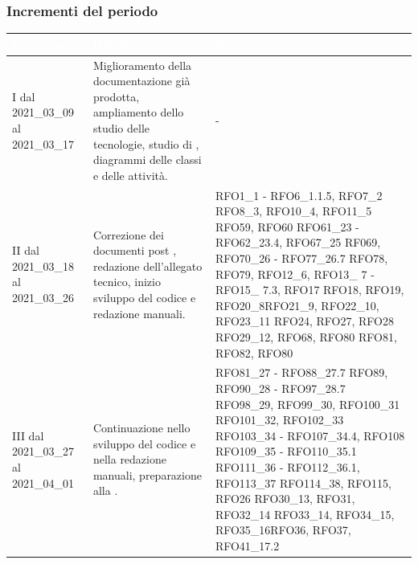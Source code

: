 \subsubsection{Incrementi del periodo}\label{IncrementiPDettaglio}
\begin{table}[H]
	\begin{center}
		\begin{tabular}{ |C{3cm} C{6cm} C{7cm}| }
			\textcolor{white}{\textbf{Incremento}} & \textcolor{white}{\textbf{Obiettivi}} & \textcolor{white}{\textbf{Requisiti}} \\ \hline
			I dal 2021\_03\_09 al 2021\_03\_17& Miglioramento della documentazione già prodotta, ampliamento dello studio delle tecnologie, studio di , diagrammi delle classi e delle attività.  & - \\ \hline
			II dal 2021\_03\_18 al 2021\_03\_26 	& Correzione dei documenti post , redazione dell'allegato tecnico, inizio sviluppo del codice e redazione manuali. &  
			RFO1\_1 - RFO6\_1.1.5, RFO7\_2 \newline
			RFO8\_3, RFO10\_4, RFO11\_5 \newline
			RFO59, RFO60 \newline
			RFO61\_23 - RFO62\_23.4, RFO67\_25 \newline
			RF069, RFO70\_26 - RFO77\_26.7 \newline
			RFO78, RFO79, RFO12\_6, \newline 
			RFO13\_ 7 - RFO15\_ 7.3, RFO17 \newline RFO18, RFO19, RFO20\_8\newline RFO21\_9, RFO22\_10, RFO23\_11 \newline RFO24, RFO27, RFO28 \newline RFO29\_12, RFO68, RFO80 \newline RFO81, RFO82, RFO80 \\ \hline
			III dal 2021\_03\_27 al 2021\_04\_01 	& Continuazione nello sviluppo del codice e nella redazione manuali, preparazione alla . & RFO81\_27 - RFO88\_27.7 \newline
			RFO89, RFO90\_28 - RFO97\_28.7 \newline
			RFO98\_29, RFO99\_30, RFO100\_31 \newline
			RFO101\_32, RFO102\_33 \newline
			RFO103\_34 - RFO107\_34.4, RFO108 \newline
			RFO109\_35 - RFO110\_35.1\newline
			RFO111\_36 - RFO112\_36.1, RFO113\_37 \newline RFO114\_38, RFO115, RFO26 \newline RFO30\_13, RFO31, RFO32\_14 \newline RFO33\_14, RFO34\_15, RFO35\_16\newline  RFO36, RFO37, RFO41\_17.2 \\ \hline

\end{tabular}
\end{center}
\end{table}
